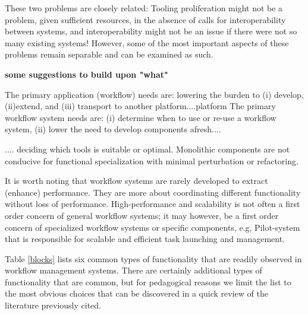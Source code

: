 These two problems are closely related: Tooling proliferation might not be a
problem, given sufficient resources, in the absence of calls for
interoperability between systems, and interoperability might not be an issue if
there were not so many existing systems! However, some of the most important
aspects of these problems remain separable and can be examined as such.

{\bf some suggestions to  build upon "what"} 

The primary application (workflow) needs are: lowering the burden to (i) develop, (ii)extend, and (iii) transport to another platform....platform The primary workflow system needs are: (i) determine when to use or re-use a workflow system, (ii) lower the need to develop components afresh....

.... deciding which tools is suitable or optimal. Monolithic components are
not conducive for functional specialization with minimal perturbation or
refactoring.

It is worth noting that workflow systems are rarely developed to extract
(enhance) performance. They are more about coordinating different
functionality without loss of performance. High-performance and scalability is
not often a first order concern of general workflow systems; it may however,
be a first order concern of specialized workflow systems or specific
components, e.g, Pilot-system that is responsible for scalable and efficient
task launching and management.

Table \ref{blocks} lists six common types of functionality that are readily
observed in workflow management systems. There are certainly additional types
of functionality that are common, but for pedagogical reasons we limit the
list to the most obvious choices that can be discovered in a quick review of
the literature previously cited.

